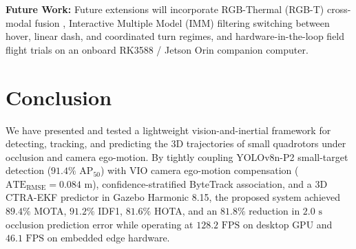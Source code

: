 \documentclass[conference]{IEEEtran}
\begin{document}
\textbf{Future Work:} Future extensions will incorporate RGB-Thermal (RGB-T) cross-modal fusion \cite{ref7}, Interactive Multiple Model (IMM) filtering switching between hover, linear dash, and coordinated turn regimes, and hardware-in-the-loop field flight trials on an onboard RK3588 / Jetson Orin companion computer.

\section{Conclusion}
We have presented and tested a lightweight vision-and-inertial framework for detecting, tracking, and predicting the 3D trajectories of small quadrotors under occlusion and camera ego-motion. By tightly coupling YOLOv8n-P2 small-target detection ($91.4\%$ $\text{AP}_{50}$) with VIO camera ego-motion compensation ($\text{ATE}_{\text{RMSE}} = 0.084\text{ m}$), confidence-stratified ByteTrack association, and a 3D CTRA-EKF predictor in Gazebo Harmonic 8.15, the proposed system achieved $89.4\%$ MOTA, $91.2\%$ IDF1, $81.6\%$ HOTA, and an $81.8\%$ reduction in $2.0\text{ s}$ occlusion prediction error while operating at $128.2\text{ FPS}$ on desktop GPU and $46.1\text{ FPS}$ on embedded edge hardware.
\end{document}
